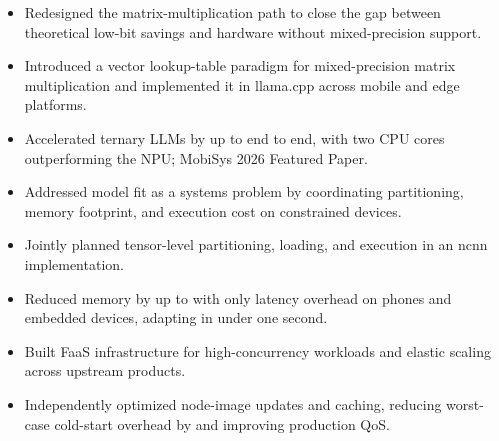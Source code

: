 \documentclass{resume-refined}
\begin{document}
\begin{itemize}
  \item Redesigned the matrix-multiplication path to close the gap between theoretical low-bit savings and hardware without mixed-precision support.
  \item Introduced a vector lookup-table paradigm for mixed-precision matrix multiplication and implemented it in llama.cpp across mobile and edge platforms.
  \item Accelerated ternary LLMs by up to  end to end, with two CPU cores outperforming the NPU; MobiSys 2026 Featured Paper. 
\end{itemize}

\begin{itemize}
  \item Addressed model fit as a systems problem by coordinating partitioning, memory footprint, and execution cost on constrained devices.
  \item Jointly planned tensor-level partitioning, loading, and execution in an ncnn implementation.
  \item Reduced memory by up to  with only  latency overhead on phones and embedded devices, adapting in under one second. 
\end{itemize}

\begin{itemize}
  \item Built FaaS infrastructure for high-concurrency workloads and elastic scaling across upstream products.
  \item Independently optimized node-image updates and caching, reducing worst-case cold-start overhead by  and improving production QoS.
\end{itemize}
\end{document}
